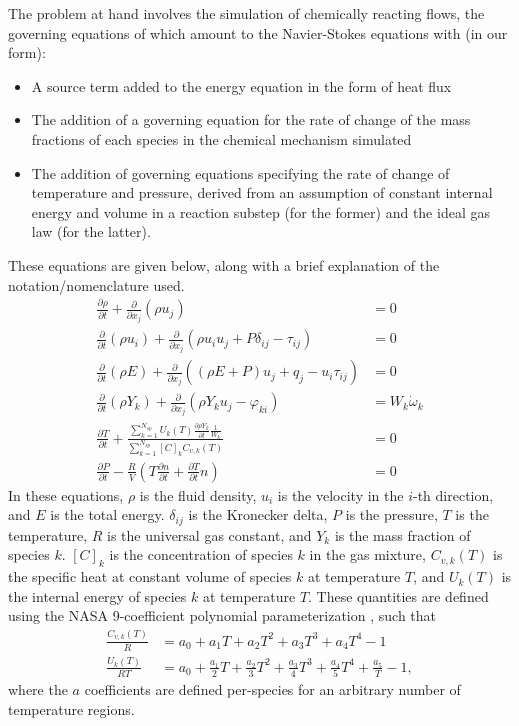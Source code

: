 The problem at hand involves the simulation of chemically reacting flows, the
governing equations of which amount to the Navier-Stokes equations with (in
our form):
\begin{itemize}
\item{A source term added to the energy equation in the form of heat flux}
\item{The addition of a governing equation for the rate of change of the
      mass fractions of each species in the chemical mechanism simulated}
\item{The addition of governing equations specifying the rate of change of
      temperature and pressure, derived from an assumption of constant
      internal energy and volume in a reaction substep (for the former)
      and the ideal gas law (for the latter).}
\end{itemize}
These equations are given below, along with a brief explanation of the notation/nomenclature
used.
\begin{align}
\frac{\partial \rho}{\partial t} + \frac{\partial}{\partial x_{j}}(\rho u_{j}) &= 0 \label{eq:consmass} \\
\frac{\partial}{\partial t}(\rho u_{i}) + \frac{\partial}{\partial x_{j}}(\rho u_{i} u_{j} + P\delta_{ij} - \tau_{ij}) &= 0 \label{eq:consmom} \\
\frac{\partial}{\partial t}(\rho E) + \frac{\partial}{\partial x_{j}}((\rho E + P)u_{j} + q_{j} - u_{i}\tau_{ij}) &= 0 \label{eq:conse} \\
\frac{\partial}{\partial t}(\rho Y_{k}) + \frac{\partial}{\partial x_{j}}(\rho Y_{k} u_{j} - \varphi_{ki}) &= W_{k}\dot{\omega}_{k} \label{eq:conssp}\\
\frac{\partial T}{\partial t} + \frac{\sum_{k=1}^{N_{sp}}U_{k}(T)\frac{\partial \rho Y_{k}}{\partial t}\frac{1}{W_{k}}}{\sum_{k=1}^{N_{sp}}[C]_{k}C_{v,k}(T)} &= 0 \label{eq:temp} \\
\frac{\partial P}{\partial t} - \frac{R}{V}(T\frac{\partial n}{\partial t} + \frac{\partial T}{\partial t}n) &= 0 \label{eq:pres}
\end{align}
In these equations, $\rho$ is the fluid density, $u_{i}$ is the velocity in the $i$-th direction, and $E$ is the total energy.
$\delta_{ij}$ is the Kronecker delta, $P$ is the pressure, $T$ is the temperature, $R$ is the universal gas constant, and $Y_{k}$ is the mass fraction of
species $k$. $[C]_{k}$ is the concentration of species $k$ in the gas mixture, $C_{v,k}(T)$ is the specific heat at constant volume
of species $k$ at temperature $T$, and $U_{k}(T)$ is the internal energy of species $k$ at temperature $T$. These quantities
are defined using the NASA 9-coefficient polynomial parameterization \cite{mcbride2002nasa}, such that
\begin{align}
\frac{C_{v,k}(T)}{R} &= a_{0} + a_{1}T + a_{2}T^{2} + a_{3}T^{3} + a_{4}T^{4} - 1 \\
\frac{U_{k}(T)}{RT} &= a_{0} + \frac{a_{1}}{2}T + \frac{a_{2}}{3}T^{2} + \frac{a_{3}}{4}T^{3} + \frac{a_{4}}{5}T^{4} + \frac{a_{5}}{T} - 1,
\end{align}
where the $a$ coefficients are defined per-species for an arbitrary number of temperature regions.


